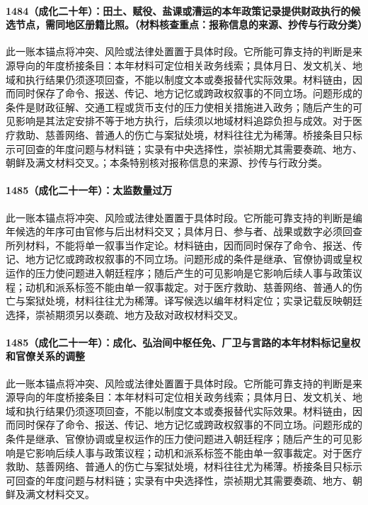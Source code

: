 \paragraph{1484（成化二十年）：田土、赋役、盐课或漕运的本年政策记录提供财政执行的候选节点，需同地区册籍比照。（材料核查重点：报称信息的来源、抄传与行政分类）} 此一账本锚点将冲突、风险或法律处置置于具体时段。它所能可靠支持的判断是来源导向的年度桥接条目：本年材料可定位相关政务线索；具体月日、发文机关、地域和执行结果仍须逐项回查，不能以制度文本或奏报替代实际效果。材料链由，因而同时保存了命令、报送、传记、地方记忆或跨政权叙事的不同立场。问题形成的条件是财政征解、交通工程或货币支付的压力使相关措施进入政务；随后产生的可见影响是其法定安排不等于地方执行，后续须以地域材料追踪负担与成效。对于医疗救助、慈善网络、普通人的伤亡与案狱处境，材料往往尤为稀薄。桥接条目只标示可回查的年度问题与材料链；实录有中央选择性，崇祯期尤其需要奏疏、地方、朝鲜及满文材料交叉。；本条特别核对报称信息的来源、抄传与行政分类。

\paragraph{1485（成化二十一年）：太监数量过万} 此一账本锚点将冲突、风险或法律处置置于具体时段。它所能可靠支持的判断是编年候选的年序可由官修与后出材料交叉；具体月日、参与者、战果或数字必须回查所列材料，不能将单一叙事当作定论。材料链由，因而同时保存了命令、报送、传记、地方记忆或跨政权叙事的不同立场。问题形成的条件是继承、官僚协调或皇权运作的压力使问题进入朝廷程序；随后产生的可见影响是它影响后续人事与政策议程；动机和派系标签不能由单一叙事裁定。对于医疗救助、慈善网络、普通人的伤亡与案狱处境，材料往往尤为稀薄。译写候选以编年材料定位；实录记载反映朝廷选择，崇祯期须另以奏疏、地方及敌对政权材料交叉。

\paragraph{1485（成化二十一年）：成化、弘治间中枢任免、厂卫与言路的本年材料标记皇权和官僚关系的调整} 此一账本锚点将冲突、风险或法律处置置于具体时段。它所能可靠支持的判断是来源导向的年度桥接条目：本年材料可定位相关政务线索；具体月日、发文机关、地域和执行结果仍须逐项回查，不能以制度文本或奏报替代实际效果。材料链由，因而同时保存了命令、报送、传记、地方记忆或跨政权叙事的不同立场。问题形成的条件是继承、官僚协调或皇权运作的压力使问题进入朝廷程序；随后产生的可见影响是它影响后续人事与政策议程；动机和派系标签不能由单一叙事裁定。对于医疗救助、慈善网络、普通人的伤亡与案狱处境，材料往往尤为稀薄。桥接条目只标示可回查的年度问题与材料链；实录有中央选择性，崇祯期尤其需要奏疏、地方、朝鲜及满文材料交叉。

